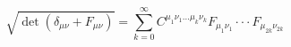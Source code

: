 \begin{equation}\label{sqrt}
    \sqrt{
        \det(
            \delta_{{\mu}{\nu}}+F_{{\mu}{\nu}})}
    \!=\!\sum^\infty_{k=0}
    C^{\mu_1\nu_1\ldots\mu_k\nu_k}F_{\mu_1\nu_1}\cdot\cdot\cdot F_{\mu_{2k}\nu_{2k}}
\end{equation}

